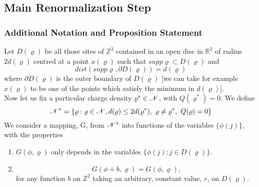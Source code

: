 \documentclass[11pt,reqno]{article}
\theoremstyle{definition}
\numberwithin{equation}{section}
\begin{document}
\subsection{Main Renormalization Step}
\subsubsection{Additional Notation and Proposition Statement}
Let $D(\varrho)$ be all those sites of $\mathbb{Z}^2$ contained in an open disc in $\mathbb{R}^2$ of radius $2d(\varrho)$ centred at a point $x(\varrho)$ such that $supp\varrho \subset D(\varrho)$ and
$$
dist(supp\varrho, \partial D(\varrho)) = d(\varrho)
$$
where $\partial D(\varrho)$ is the outer boundary of $D(\varrho)$ [we can take for example $x(\varrho)$ to be one of the points which satisfy the minimum in $d(\varrho)$].\\
Now let us fix a particular charge density $\varrho^* \in \mathscr{N}$, with $Q(\varrho^*)=0$.
We define 
$$
\mathscr{N}^* = \{\varrho: \varrho \in \mathscr{N}, d(\varrho)\leq 2d(\varrho^*),\ \varrho \neq \varrho^*,\  Q(\varrho)=0\}
$$
We consider a mapping, G, from $\mathscr{N}^*$ into functions of the variables $\{ \phi(j) \}$, with the properties
\begin{enumerate}
\item $G(\phi, \varrho)$ only depends in the variables $\{ \phi(j): j \in D(\varrho) \}$.
\item 
\begin{equation} \label{lab:eq428}
G(\phi + b, \varrho) = G(\phi, \varrho), 
\end{equation}
for any function $b$ on $\mathbb{Z}^2$ taking an arbitrary, constant value, $r$, on $D(\varrho)$.
\end{enumerate}
\end{document}
